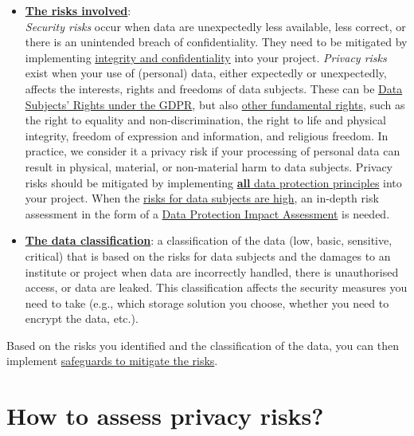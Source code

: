 \documentclass[
]{book}
\begin{document}
\begin{itemize}
\item
  \textbf{\protect\hyperlink{risk-assessment-how}{The risks involved}}:\\
  \emph{Security risks} occur when data are unexpectedly less available, less correct, or
  there is an unintended breach of confidentiality. They need to be mitigated by
  implementing \protect\hyperlink{integrity-and-confidentiality}{integrity and confidentiality} into your project.
  \emph{Privacy risks} exist when your use of (personal) data, either expectedly or
  unexpectedly, affects the interests, rights and freedoms of data subjects. These can be \protect\hyperlink{data-subject-rights}{Data Subjects' Rights under the GDPR}, but also
  \href{https://eur-lex.europa.eu/legal-content/EN/TXT/HTML/?uri=CELEX:12012P/TXT\&from=EN}{other fundamental rights},
  such as the right to equality and non-discrimination, the right to life and
  physical integrity, freedom of expression and information, and religious freedom.
  In practice, we consider it a privacy risk if your processing of personal data
  can result in physical, material, or non-material harm to data subjects. Privacy
  risks should be mitigated by implementing
  \protect\hyperlink{gdpr-principles}{\textbf{all} data protection principles} into your project.
  When the \protect\hyperlink{high-risk-processing}{risks for data subjects are high}, an in-depth
  risk assessment in the form of a \protect\hyperlink{dpia}{Data Protection Impact Assessment} is needed.
\item
  \textbf{\protect\hyperlink{data-classification}{The data classification}}: a classification of the
  data (low, basic, sensitive, critical) that is based on the risks for data
  subjects and the damages to an institute or project when data are incorrectly
  handled, there is unauthorised access, or data are leaked. This classification
  affects the security measures you need to take (e.g., which storage solution you
  choose, whether you need to encrypt the data, etc.).
\end{itemize}

Based on the risks you identified and the classification of the data, you can
then implement \protect\hyperlink{example-risks}{safeguards to mitigate the risks}.

\hypertarget{risk-assessment-how}{%
\section{How to assess privacy risks?}\label{risk-assessment-how}}
\end{document}
